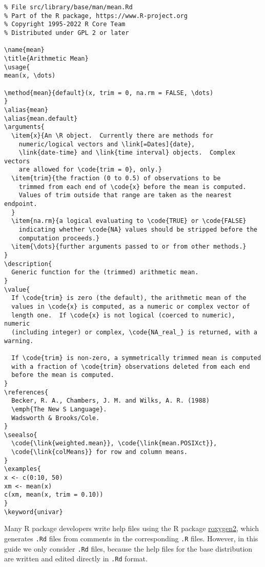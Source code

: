 \documentclass[
  letterpaper,
  DIV=11,
  numbers=noendperiod]{scrreprt}
\begin{document}
\begin{verbatim}
% File src/library/base/man/mean.Rd
% Part of the R package, https://www.R-project.org
% Copyright 1995-2022 R Core Team
% Distributed under GPL 2 or later

\name{mean}
\title{Arithmetic Mean}
\usage{
mean(x, \dots)

\method{mean}{default}(x, trim = 0, na.rm = FALSE, \dots)
}
\alias{mean}
\alias{mean.default}
\arguments{
  \item{x}{An \R object.  Currently there are methods for
    numeric/logical vectors and \link[=Dates]{date},
    \link{date-time} and \link{time interval} objects.  Complex vectors
    are allowed for \code{trim = 0}, only.}
  \item{trim}{the fraction (0 to 0.5) of observations to be
    trimmed from each end of \code{x} before the mean is computed.
    Values of trim outside that range are taken as the nearest endpoint.
  }
  \item{na.rm}{a logical evaluating to \code{TRUE} or \code{FALSE}
    indicating whether \code{NA} values should be stripped before the
    computation proceeds.} 
  \item{\dots}{further arguments passed to or from other methods.}
}
\description{
  Generic function for the (trimmed) arithmetic mean.
}
\value{
  If \code{trim} is zero (the default), the arithmetic mean of the
  values in \code{x} is computed, as a numeric or complex vector of
  length one.  If \code{x} is not logical (coerced to numeric), numeric
  (including integer) or complex, \code{NA_real_} is returned, with a warning.

  If \code{trim} is non-zero, a symmetrically trimmed mean is computed
  with a fraction of \code{trim} observations deleted from each end
  before the mean is computed.
}
\references{
  Becker, R. A., Chambers, J. M. and Wilks, A. R. (1988)
  \emph{The New S Language}.
  Wadsworth & Brooks/Cole.
}
\seealso{
  \code{\link{weighted.mean}}, \code{\link{mean.POSIXct}},
  \code{\link{colMeans}} for row and column means.
}
\examples{
x <- c(0:10, 50)
xm <- mean(x)
c(xm, mean(x, trim = 0.10))
}
\keyword{univar}
\end{verbatim}

Many R package developers write help files using the R package
\href{https://cran.r-project.org/package=roxygen2}{roxygen2}, which
generates \texttt{.Rd} files from comments in the corresponding
\texttt{.R} files. However, in this guide we only consider \texttt{.Rd}
files, because the help files for the base distribution are written and
edited directly in \texttt{.Rd} format.
\end{document}
